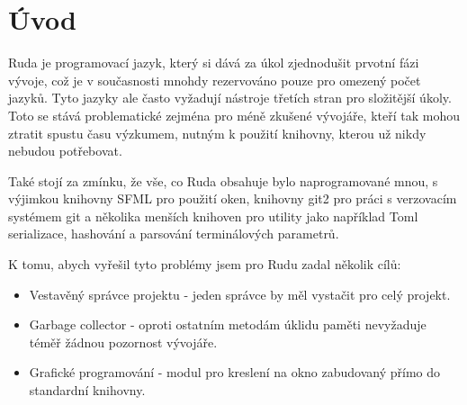 \documentclass[12pt, a4paper,
twoside,        %
openright
]{report}
\begin{document}
	\tableofcontents %

	\setcounter{page}{1} %
	
	\clearpage

	\chapter*{Úvod}
Ruda je programovací jazyk, který si dává za úkol zjednodušit prvotní fázi vývoje, což je v současnosti mnohdy rezervováno pouze pro omezený počet jazyků. Tyto jazyky ale často vyžadují nástroje třetích stran pro složitější úkoly. Toto se stává problematické zejména pro méně zkušené vývojáře, kteří tak mohou ztratit spustu času výzkumem, nutným k použití knihovny, kterou už nikdy nebudou potřebovat. 

Také stojí za zmínku, že vše, co Ruda obsahuje bylo naprogramované mnou, s výjimkou knihovny SFML pro použití oken, knihovny git2 pro práci s verzovacím systémem git a několika menších knihoven pro utility jako například Toml serializace, hashování a parsování terminálových parametrů.

\noindent
K tomu, abych vyřešil tyto problémy jsem pro Rudu zadal několik cílů:
\begin{itemize}
	\item Vestavěný správce projektu - jeden správce by měl vystačit pro celý projekt.
	\item Garbage collector - oproti ostatním metodám úklidu paměti nevyžaduje téměř žádnou pozornost vývojáře.
	\item Grafické programování - modul pro kreslení na okno zabudovaný přímo do standardní knihovny.
\end{itemize}
\end{document}
